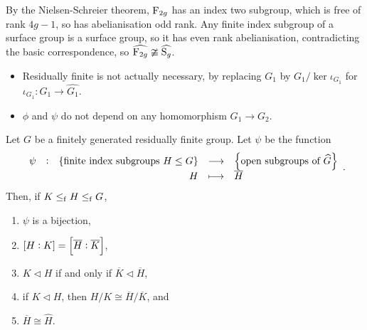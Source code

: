 By the Nielsen-Schreier theorem, $ \mathrm{F}_{2g} $ has an index two subgroup, which is free of rank $ 4g - 1 $, so has abelianisation odd rank. Any finite index subgroup of a surface group is a surface group, so it has even rank abelianisation, contradicting the basic correspondence, so $ \widehat{\mathrm{F}_{2g}} \ncong \widehat{\mathrm{S}_g} $.


\begin{remark}
\hfill
\begin{itemize}
\item Residually finite is not actually necessary, by replacing $ G_1 $ by $ G_1 / \ker \iota_{G_1} $ for $ \iota_{G_1} : G_1 \to \widehat{G_1} $.
\item $ \phi $ and $ \psi $ do not depend on any homomorphism $ G_1 \to G_2 $.
\end{itemize}
\end{remark}

\begin{proposition}
Let $ G $ be a finitely generated residually finite group. Let $ \psi $ be the function
$$ \function[\psi]{\cbr{\text{finite index subgroups} \ H \le G}}{\cbr{\text{open subgroups of} \ \widehat{G}}}{H}{\overline{H}}. $$
Then, if $ K \le_{\mathrm{f}} H \le_{\mathrm{f}} G $,
\begin{enumerate}
\item $ \psi $ is a bijection,
\item $ \sbr{H : K} = \sbr{\overline{H} : \overline{K}} $,
\item $ K \triangleleft H $ if and only if $ \overline{K} \triangleleft \overline{H} $,
\item if $ K \triangleleft H $, then $ H / K \cong \overline{H} / \overline{K} $, and
\item $ \overline{H} \cong \widehat{H} $.
\end{enumerate}
\end{proposition}

